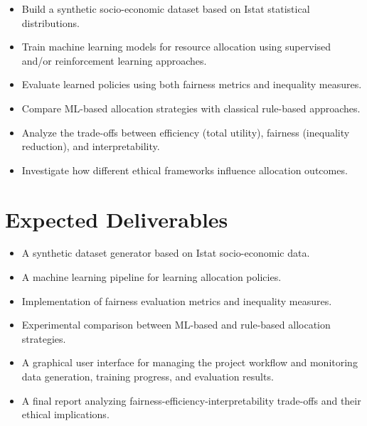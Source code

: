 \documentclass[11pt]{article}
\begin{document}
\begin{itemize}
    \item Build a synthetic socio-economic dataset based on Istat statistical distributions.
    \item Train machine learning models for resource allocation using supervised and/or reinforcement learning approaches.
    \item Evaluate learned policies using both fairness metrics and inequality measures.
    \item Compare ML-based allocation strategies with classical rule-based approaches.
    \item Analyze the trade-offs between efficiency (total utility), fairness (inequality reduction), and interpretability.
    \item Investigate how different ethical frameworks influence allocation outcomes.
\end{itemize}

\section{Expected Deliverables}

\begin{itemize}
    \item A synthetic dataset generator based on Istat socio-economic data.
    \item A machine learning pipeline for learning allocation policies.
    \item Implementation of fairness evaluation metrics and inequality measures.
    \item Experimental comparison between ML-based and rule-based allocation strategies.
    \item A graphical user interface for managing the project workflow and monitoring data generation, training progress, and evaluation results.
    \item A final report analyzing fairness-efficiency-interpretability trade-offs and their ethical implications.
\end{itemize}
\end{document}

